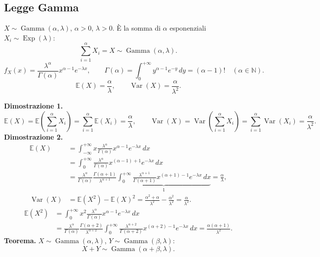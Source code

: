 \subsection*{Legge Gamma}
$X\sim\operatorname{Gamma}(\alpha,\lambda)$, $\alpha>0$, $\lambda>0$. È la somma di $\alpha$ esponenziali $X_i\sim\operatorname{Exp}(\lambda)$:
\[ \sum_{i=1}^{\alpha}X_i=X\sim\operatorname{Gamma}(\alpha,\lambda). \]
\[\boxed{f_X(x)=\frac{\lambda^\alpha}{\Gamma(\alpha)}x^{\alpha-1}e^{-\lambda x}},\qquad
\Gamma(\alpha)=\int_0^{+\infty}y^{\alpha-1}e^{-y}\,dy=(\alpha-1)!\quad(\alpha\in\mathbb N).\]
\[\boxed{\mathbb E(X)=\frac\alpha\lambda,\qquad\operatorname{Var}(X)=\frac\alpha{\lambda^2}.}\]
\begin{center}\end{center}
\textbf{Dimostrazione 1.}
\[\mathbb E(X)=\mathbb E\left(\sum_{i=1}^{\alpha}X_i\right)=\sum_{i=1}^{\alpha}\mathbb E(X_i)=\frac\alpha\lambda,\qquad
\operatorname{Var}(X)=\operatorname{Var}\left(\sum_{i=1}^{\alpha}X_i\right)=\sum_{i=1}^{\alpha}\operatorname{Var}(X_i)=\frac\alpha{\lambda^2}.\]
\textbf{Dimostrazione 2.}
\begin{align*}
\mathbb E(X)&=\int_{-\infty}^{+\infty}x\frac{\lambda^\alpha}{\Gamma(\alpha)}x^{\alpha-1}e^{-\lambda x}\,dx\\
&=\int_0^{+\infty}\frac{\lambda^\alpha}{\Gamma(\alpha)}x^{(\alpha-1)+1}e^{-\lambda x}\,dx\\
&=\frac{\lambda^\alpha}{\Gamma(\alpha)}\frac{\Gamma(\alpha+1)}{\lambda^{\alpha+1}}
\underbrace{\int_0^{+\infty}\frac{\lambda^{\alpha+1}}{\Gamma(\alpha+1)}x^{(\alpha+1)-1}e^{-\lambda x}\,dx}_{1}=\frac\alpha\lambda,\\
\operatorname{Var}(X)&=\mathbb E(X^2)-\mathbb E(X)^2
=\frac{\alpha^2+\alpha}{\lambda^2}-\frac{\alpha^2}{\lambda^2}=\frac\alpha{\lambda^2}.
\end{align*}
\begin{align*}
\mathbb E(X^2)&=\int_0^{+\infty}x^2\frac{\lambda^\alpha}{\Gamma(\alpha)}x^{\alpha-1}e^{-\lambda x}\,dx\\
&=\frac{\lambda^\alpha}{\Gamma(\alpha)}\frac{\Gamma(\alpha+2)}{\lambda^{\alpha+2}}
\int_0^{+\infty}\frac{\lambda^{\alpha+2}}{\Gamma(\alpha+2)}x^{(\alpha+2)-1}e^{-\lambda x}\,dx
=\frac{\alpha(\alpha+1)}{\lambda^2}.
\end{align*}
\textbf{Teorema.} $X\sim\operatorname{Gamma}(\alpha,\lambda)$, $Y\sim\operatorname{Gamma}(\beta,\lambda)$:
\[X+Y\sim\operatorname{Gamma}(\alpha+\beta,\lambda).\]
